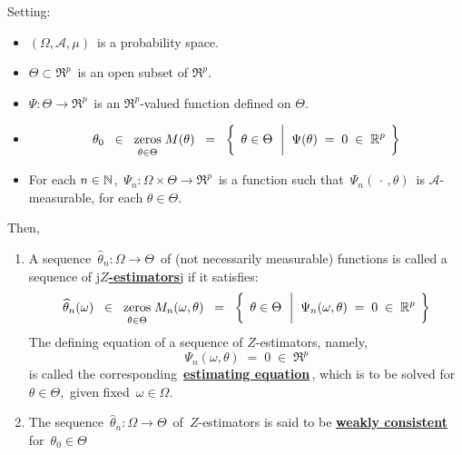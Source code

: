 \begin{definition}[$Z$-Estimators]
\mbox{}
\vskip 0.1cm
\noindent
Setting:
\begin{itemize}
\item
	$(\Omega,\mathcal{A},\mu)$\, is a probability space.
\item
	$\Theta \subset \Re^{p}$\, is an open subset of $\Re^{p}$.
\item
	$\Psi : \Theta \longrightarrow \Re^{p}$\, is an $\Re^{p}$-valued function defined on $\Theta$.
\item
	\begin{equation*}
	\theta_{0}
	\;\; \in \;\;
		\underset{\theta\overset{{\color{white}.}}{\in}\Theta}{\zeros}\; M(\theta)
	\;\; = \;\;
		\left\{\;\,
			\theta \in \Theta
			\,\;\left\vert\;\;
				\overset{{\color{white}1}}{\Psi}(\theta) \;=\; 0 \;\in\; \Re^{p}
				\right.
			\;\right\}
	\end{equation*}
\item
	For each $n \in \mathbb{N}$, \,$\Psi_{n} : \Omega \times \Theta \longrightarrow \Re^{p}$\,
	is a function such that \,$\Psi_{n}(\,\cdot\,,\theta)$\, is $\mathcal{A}$-measurable,
	for each $\theta \in \Theta$.
\end{itemize}
Then,
\begin{enumerate}
\item
	A sequence
	\,$\widehat{\theta}_{n} : \Omega \longrightarrow \Theta$\,
	of (not necessarily measurable) functions
	is called a sequence of \underline{{\color{white}j}\textbf{$Z$-estimators}{\color{white}j}}
	if it satisfies:
	\begin{equation*}
	\widehat{\theta}_{n}(\omega)
	\;\; \in \;\;
		\underset{\theta\overset{{\color{white}.}}{\in}\Theta}{\zeros}\; M_{n}(\omega,\theta)
	\;\; = \;\;
		\left\{\;\,
			\theta \in \Theta
			\,\;\left\vert\;\;
				\overset{{\color{white}1}}{\Psi}_{n}(\omega,\theta) \;=\; 0 \;\in\; \Re^{p}
				\right.
			\;\right\}
	\end{equation*}
	The defining equation of a sequence of $Z$-estimators, namely,
	\begin{equation*}
	\Psi_{n}(\omega,\theta) \;=\; 0 \;\in\; \Re^{p}
	\end{equation*}
	is called the corresponding \,\underline{\textbf{estimating equation}}\,,
	which is to be solved for \,$\theta \in \Theta$,\, given fixed \,$\omega \in \Omega$.\,
\item
	The sequence
	\,$\widehat{\theta}_{n} : \Omega \longrightarrow \Theta$\,
	of \,$Z$-estimators is said to be
	\underline{\textbf{weakly consistent}}\, for \,$\theta_{0} \in \Theta$\,

\end{enumerate}
\end{definition}
